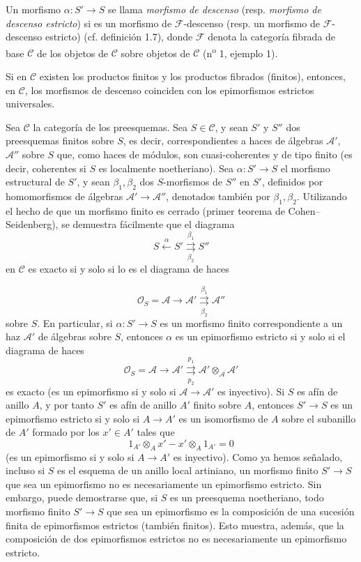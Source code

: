  Un morfismo $\alpha:S'\longrightarrow S$ se llama
\emph{morfismo de descenso} (resp. \emph{morfismo de descenso estricto}) si es
un morfismo de $\mathcal F$-descenso (resp. un morfismo de
$\mathcal F$-descenso estricto) (cf. definición 1.7), donde $\mathcal F$ denota
la categoría fibrada de base $\mathcal C$ de los objetos de $\mathcal C$ sobre
objetos de $\mathcal C$ (n\textsuperscript{o} 1, ejemplo 1).

 Si en $\mathcal C$ existen los productos finitos y
los productos fibrados (finitos), entonces, en $\mathcal C$, los morfismos de
descenso coinciden con los epimorfismos estrictos universales.

 Sea $\mathcal C$ la categoría de los preesquemas. Sea
$S\in\mathcal C$, y sean $S'$ y $S''$ dos preesquemas finitos sobre $S$, es
decir, correspondientes a haces de álgebras $\mathcal A'$, $\mathcal A''$
sobre $S$ que, como haces de módulos, son cuasi-coherentes y de tipo finito (es
decir, coherentes si $S$ es localmente noetheriano). Sea
$\alpha:S'\longrightarrow S$ el morfismo estructural de $S'$, y sean
$\beta_1,\beta_2$ dos $S$-morfismos de $S''$ en $S'$, definidos por
homomorfismos de álgebras $\mathcal A'\longrightarrow\mathcal A''$, denotados
también por $\beta_1,\beta_2$. Utilizando el hecho de que un morfismo finito es
cerrado (primer teorema de Cohen--Seidenberg), se demuestra fácilmente que el
diagrama
\[
  \tag{+}
  S\xleftarrow{\alpha}S'
  \overset{\beta_1}{\underset{\beta_2}{\rightrightarrows}}S''
\]
en $\mathcal C$ es exacto si y solo si lo es el diagrama de haces

\[
  \mathcal O_S=\mathcal A\longrightarrow\mathcal A'
  \overset{\beta_1}{\underset{\beta_2}{\rightrightarrows}}\mathcal A''
\]
sobre $S$. En particular, si $\alpha:S'\longrightarrow S$ es un morfismo
finito correspondiente a un haz $\mathcal A'$ de álgebras sobre $S$, entonces
$\alpha$ es un epimorfismo estricto si y solo si el diagrama de haces
\[
  \mathcal O_S=\mathcal A\longrightarrow\mathcal A'
  \overset{p_1}{\underset{p_2}{\rightrightarrows}}
  \mathcal A'\otimes_{\mathcal A}\mathcal A'
\]
es exacto (es un epimorfismo si y solo si
$\mathcal A\longrightarrow\mathcal A'$ es inyectivo). Si $S$ es afín de anillo
$A$, y por tanto $S'$ es afín de anillo $A'$ finito sobre $A$, entonces
$S'\longrightarrow S$ es un epimorfismo estricto si y solo si
$A\longrightarrow A'$ es un isomorfismo de $A$ sobre el subanillo de $A'$
formado por los $x'\in A'$ tales que
\[
  1_{A'}\otimes_Ax'-x'\otimes_A1_{A'}=0
\]
(es un epimorfismo si y solo si $A\longrightarrow A'$ es inyectivo). Como ya
hemos señalado, incluso si $S$ es el esquema de un anillo local artiniano, un
morfismo finito $S'\longrightarrow S$ que sea un epimorfismo no es
necesariamente un epimorfismo estricto. Sin embargo, puede demostrarse que, si
$S$ es un preesquema noetheriano, todo morfismo finito
$S'\longrightarrow S$ que sea un epimorfismo es la composición de una sucesión
finita de epimorfismos estrictos (también finitos). Esto muestra, además, que
la composición de dos epimorfismos estrictos no es necesariamente un
epimorfismo estricto.

